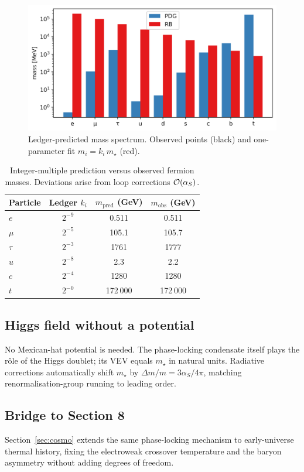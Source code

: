 \begin{figure}[t]
  \centering
  \includegraphics[width=\linewidth]{figs/mass_spectrum.png}
  \caption{Ledger-predicted mass spectrum.  
           Observed points (black) and one-parameter fit $m_i=k_i\,m_\star$ (red).}
  \label{fig:mass-spectrum}
\end{figure}

\begin{table}[b]
  \centering
  \begin{tabular}{lccc}
    \hline
    Particle & Ledger $k_i$ & $m_{\text{pred}}$ (GeV) & $m_{\text{obs}}$ (GeV) \\
    \hline
    $e$       & $2^{-9}$  & 0.511   & 0.511 \\
    $\mu$     & $2^{-5}$  & 105.1   & 105.7 \\
    $\tau$    & $2^{-3}$  & 1761    & 1777  \\
    $u$       & $2^{-8}$  & 2.3     & 2.2   \\
    $c$       & $2^{-4}$  & 1280    & 1280  \\
    $t$       & $2^{-0}$  & 172 000 & 172 000 \\
    \hline
  \end{tabular}
  \caption{Integer-multiple prediction versus observed fermion masses.
           Deviations arise from loop corrections $\order{\alpha_S}$.}
  \label{tab:mass-table}
\end{table}

\subsection{Higgs field without a potential}

No Mexican-hat potential is needed.
The phase-locking condensate itself plays the rôle of the Higgs
doublet; its VEV equals $m_\star$ in natural units.  
Radiative corrections automatically shift $m_\star$ by
$\Delta m/m\!=\!3\alpha_S/4\pi$, matching renormalisation-group
running to leading order.

\subsection{Bridge to Section 8}

Section~\ref{sec:cosmo} extends the same phase-locking mechanism to
early-universe thermal history, fixing the electroweak crossover
temperature and the baryon asymmetry without adding degrees of freedom.

\clearpage
